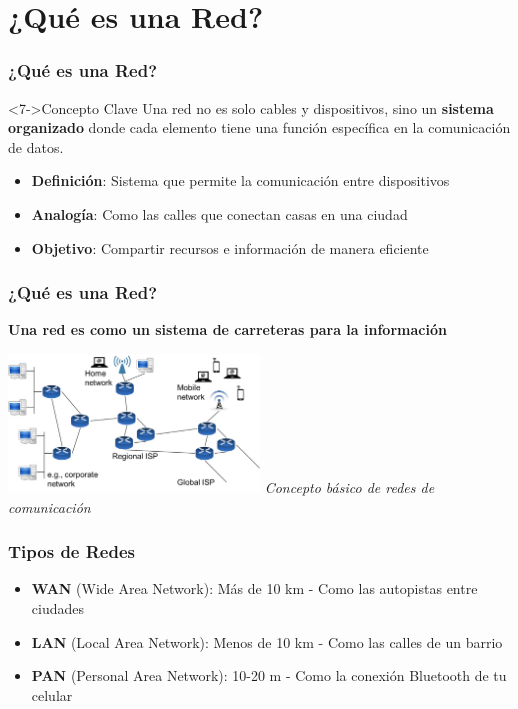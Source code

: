 \documentclass[aspectratio=169]{beamer}
\begin{document}
\section{¿Qué es una Red?}

\begin{frame}
\frametitle{¿Qué es una Red?}
\begin{block}<7->{Concepto Clave}
  Una red no es solo cables y dispositivos, sino un \textbf{sistema organizado} 
donde cada elemento tiene una función específica en la comunicación de datos.
  \end{block}
\begin{itemize}
\item<1-> \textbf{Definición}: Sistema que permite la comunicación entre dispositivos
\item<2-> \textbf{Analogía}: Como las calles que conectan casas en una ciudad
\item<3-> \textbf{Objetivo}: Compartir recursos e información de manera eficiente
\end{itemize}
\end{frame}

\begin{frame}
  \frametitle{¿Qué es una Red?}
  \begin{center}
  \Large \textbf{Una red es como un sistema de carreteras para la información}
  \end{center}
  
  \begin{center}
  \includegraphics[width=0.5\textwidth]{figuras/image100.png}
  \small \textit{Concepto básico de redes de comunicación}
  \end{center}
  \end{frame}

\begin{frame}
  \frametitle{Tipos de Redes}

\begin{itemize}
\item \textbf{WAN} (Wide Area Network): Más de 10 km - Como las autopistas entre ciudades
\item \textbf{LAN} (Local Area Network): Menos de 10 km - Como las calles de un barrio
\item \textbf{PAN} (Personal Area Network): 10-20 m - Como la conexión Bluetooth de tu celular
\end{itemize}

\end{frame}
\end{document}
